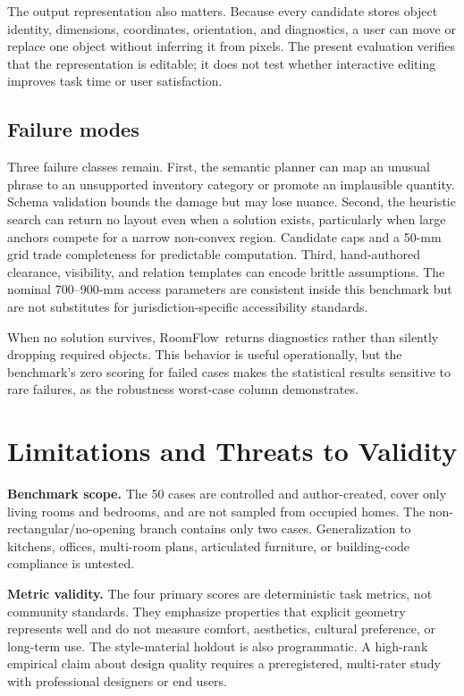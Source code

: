 \documentclass[pdflatex,sn-mathphys-num]{sn-jnl}
\newcommand{\method}{RoomFlow}
\begin{document}
The output representation also matters. Because every candidate stores object identity, dimensions, coordinates, orientation, and diagnostics, a user can move or replace one object without inferring it from pixels. The present evaluation verifies that the representation is editable; it does not test whether interactive editing improves task time or user satisfaction.

\subsection{Failure modes}

Three failure classes remain. First, the semantic planner can map an unusual phrase to an unsupported inventory category or promote an implausible quantity. Schema validation bounds the damage but may lose nuance. Second, the heuristic search can return no layout even when a solution exists, particularly when large anchors compete for a narrow non-convex region. Candidate caps and a 50-mm grid trade completeness for predictable computation. Third, hand-authored clearance, visibility, and relation templates can encode brittle assumptions. The nominal 700--900-mm access parameters are consistent inside this benchmark but are not substitutes for jurisdiction-specific accessibility standards.

When no solution survives, \method\ returns diagnostics rather than silently dropping required objects. This behavior is useful operationally, but the benchmark's zero scoring for failed cases makes the statistical results sensitive to rare failures, as the robustness worst-case column demonstrates.

\section{Limitations and Threats to Validity}\label{sec:limitations}

\textbf{Benchmark scope.} The 50 cases are controlled and author-created, cover only living rooms and bedrooms, and are not sampled from occupied homes. The non-rectangular/no-opening branch contains only two cases. Generalization to kitchens, offices, multi-room plans, articulated furniture, or building-code compliance is untested.

\textbf{Metric validity.} The four primary scores are deterministic task metrics, not community standards. They emphasize properties that explicit geometry represents well and do not measure comfort, aesthetics, cultural preference, or long-term use. The style-material holdout is also programmatic. A high-rank empirical claim about design quality requires a preregistered, multi-rater study with professional designers or end users.
\end{document}
